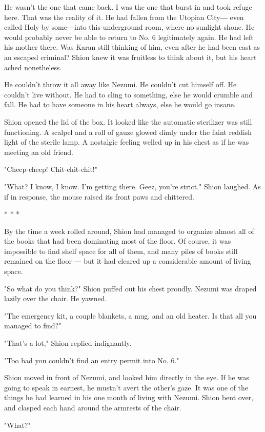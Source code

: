 He wasn't the one that came back. I was the one that burst in and took
refuge here. That was the reality of it. He had fallen from the Utopian
City― even called Holy by some―into this underground room, where no
sunlight shone. He would probably never be able to return to No. 6
legitimately again. He had left his mother there. Was Karan still
thinking of him, even after he had been cast as an escaped criminal?
Shion knew it was fruitless to think about it, but his heart ached
nonetheless.

He couldn't throw it all away like Nezumi. He couldn't cut himself off.
He couldn't live without. He had to cling to something, else he would
crumble and fall. He had to have someone in his heart always, else he
would go insane.

Shion opened the lid of the box. It looked like the automatic sterilizer
was still functioning. A scalpel and a roll of gauze glowed dimly under
the faint reddish light of the sterile lamp. A nostalgic feeling welled
up in his chest as if he was meeting an old friend.

"Cheep-cheep! Chit-chit-chit!"

"What? I know, I know. I'm getting there. Geez, you're strict." Shion
laughed. As if in response, the mouse raised its front paws and
chittered.

* * *

By the time a week rolled around, Shion had managed to organize almost
all of the books that had been dominating most of the floor. Of course,
it was impossible to find shelf space for all of them, and many piles of
books still remained on the floor ― but it had cleared up a considerable
amount of living space.

"So what do you think?" Shion puffed out his chest proudly. Nezumi was
draped lazily over the chair. He yawned.

"The emergency kit, a couple blankets, a mug, and an old heater. Is that
all you managed to find?"

"That's a lot," Shion replied indignantly.

"Too bad you couldn't find an entry permit into No. 6."

Shion moved in front of Nezumi, and looked him directly in the eye. If
he was going to speak in earnest, he mustn't avert the other's gaze. It
was one of the things he had learned in his one month of living with
Nezumi. Shion bent over, and clasped each hand around the armrests of
the chair.

"What?"

